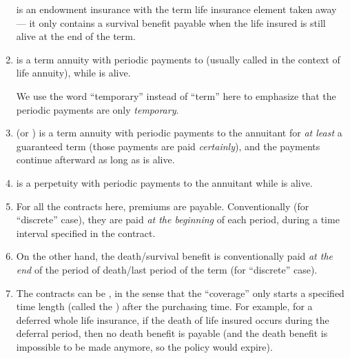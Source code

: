 \begin{enumerate}
\begin{note}
 is an endowment insurance with the term life insurance
element taken away --- it only contains a survival benefit payable when the
life insured is still alive at the end of the term.
\end{note}

\item {} is a term  annuity with periodic
payments  to  (usually called
 in the context of life annuity), while  is alive.

\begin{note}
We use the word ``temporary'' instead of ``term'' here to emphasize that the periodic payments are only \emph{temporary}.
\end{note}

\item {} (or ) is a term
 annuity with periodic payments  to
the annuitant  for \emph{at least} a guaranteed 
term (those payments are paid \emph{certainly}), and the payments continue
afterward as long as  is alive.

\item {} is a perpetuity with periodic payments
 to the annuitant  while  is
alive.

\item For all the contracts here, premiums  are payable.
Conventionally (for ``discrete'' case), they are paid \emph{at the
beginning} of each period, during a time interval specified in the contract.

\item On the other hand, the death/survival benefit is conventionally paid
\emph{at the end} of the period of death/last period of the term  (for
``discrete'' case).

\item \label{it:deferral} The contracts can be , in the sense
that the ``coverage'' only starts a specified time length (called the
) after the purchasing time. For example, for a deferred
whole life insurance, if the death of life insured  occurs during
the deferral period, then no death benefit is payable (and the death benefit is
impossible to be made anymore, so the policy would expire).


\end{enumerate}
